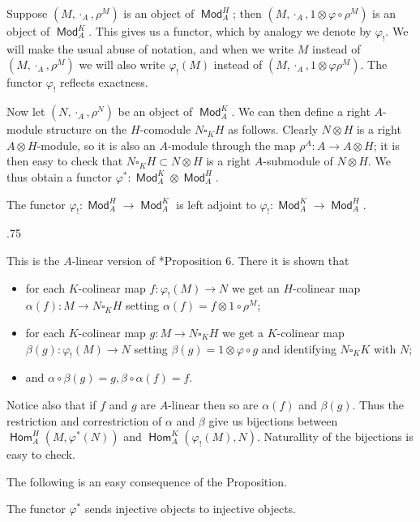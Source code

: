 \documentclass[11pt,fleqn]{article}
\makeatletter
\renewenvironment{proof}[1][\textit{Proof}]{\par
  \pushQED{\qed}%
  \normalfont \topsep.75\paraskip\relax
  \trivlist
  \item[\hskip\labelsep
        \itshape
    #1\@addpunct{.}]\ignorespaces
}{%
  \popQED\endtrivlist\@endpefalse
}
\newcommand\ot{\otimes}
\newcommand\sq{\square}
\renewcommand\to{\longrightarrow}
\renewcommand\phi{\varphi}
\DeclareMathOperator\Mod{\mathsf{Mod}}
\DeclareMathOperator\Hom{\mathsf{Hom}}
\makeatother
\begin{document}
Suppose $(M, \cdot_A, \rho^M)$ is an object of $\Mod^H_A$; then $(M, \cdot_A,
1 \ot \phi \circ \rho^M)$ is an object of $\Mod^K_A$. This gives us a functor,
which by analogy we denote by $\phi_!$. We will make the usual abuse of 
notation, and when we write $M$ instead of $(M, \cdot_A, \rho^M)$ we will also
write $\phi_!(M)$ instead of $(M, \cdot_A, 1 \ot \phi \rho^M)$. The functor 
$\phi_!$ reflects exactness.

Now let $(N, \cdot_A, \rho^N)$ be an object of $\Mod^K_A$. We can then define 
a right $A$-module structure on the $H$-comodule $N \sq_K H$ as follows.
Clearly $N \ot H$ is a right $A \ot H$-module, so it is also an $A$-module
through the map $\rho^A: A \to A \ot H$; it is then easy to check that $N 
\sq_K H \subset N \ot H$ is a right $A$-submodule of $N \ot H$. We thus
obtain a functor $\phi^*: \Mod^K_A \ot \Mod^H_A$. 

\begin{Proposition*}
The functor $\phi_!: \Mod^H_A \to \Mod^K_A$ is left adjoint to $\phi_!: 
\Mod^K_A \to \Mod^H_A$.
\end{Proposition*}
\begin{proof}
This is the $A$-linear version of \cite{Doi-coalg}*{Proposition 6}. There
it is shown that 
\begin{itemize}
\item for each $K$-colinear map $f: \phi_!(M) \to N$ we get
an $H$-colinear map $\alpha(f): M \to N \sq_K H$ setting $\alpha(f) = f \ot 1 
\circ \rho^M$;

\item for each $K$-colinear map $g: M \to N \sq_K H$ we get a $K$-colinear map 
$\beta(g): \phi_!(M) \to N$ setting $\beta(g) = 1 \ot \phi \circ g$ and 
identifying $N \sq_K K$ with $N$;

\item and $\alpha \circ \beta(g) = g, \beta \circ \alpha (f) = f$.
\end{itemize}
Notice also that if $f$ and $g$ are $A$-linear then so are $\alpha(f)$ and 
$\beta(g)$. Thus the restriction and correstriction of $\alpha$ and $\beta$
give us bijections between $\Hom^H_A(M, \phi^*(N))$ and $\Hom_A^K(\phi_!(M), 
N)$. Naturallity of the bijections is easy to check.
\end{proof}

The following is an easy consequence of the Proposition.
\begin{Corollary*}
The functor $\phi^*$ sends injective objects to injective objects.
\end{Corollary*}
\end{document}
